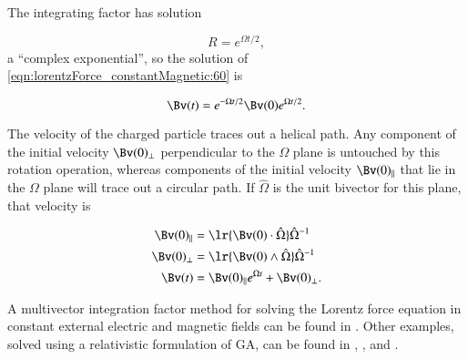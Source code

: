 The integrating factor has solution

\begin{dmath}\label{eqn:lorentzForce_constantMagnetic:180}
R = e^{\Omega t/2},
\end{dmath}
a ``complex exponential'', so the solution of \cref{eqn:lorentzForce_constantMagnetic:60} is

\begin{dmath}\label{eqn:lorentzForce_constantMagnetic:200}
\Bv(t) = e^{-\Omega t/2} \Bv(0) e^{\Omega t/2}.
\end{dmath}

The velocity of the charged particle traces out a helical path.
Any component of the initial velocity \( \Bv(0)_\perp \) perpendicular to the \( \Omega \) plane is untouched by this rotation operation, whereas components of the initial velocity \( \Bv(0)_\parallel \) that lie in the \( \Omega \) plane will trace out a circular path.
If \( \hat{\Omega} \) is the unit bivector for this plane, that velocity is

\begin{dmath}\label{eqn:lorentzForce_constantMagnetic:220}
\begin{aligned}
\Bv(0)_\parallel &= \lr{ \Bv(0) \cdot \hat{\Omega} } \hat{\Omega}^{-1} \\
\Bv(0)_\perp &= \lr{ \Bv(0) \wedge \hat{\Omega} } \hat{\Omega}^{-1} \\
\Bv(t) &= \Bv(0)_\parallel e^{\Omega t} + \Bv(0)_\perp.
\end{aligned}
\end{dmath}

A multivector integration factor method for solving the Lorentz force equation in constant external electric and magnetic fields can be found in \citep{hestenes1999nfc}.  Other examples, solved using a relativistic formulation of GA, can be found in \citep{doran2003gap},
\citep{hestenes1974properdynamics}, and
\citep{hestenes1974propermechanics}.
